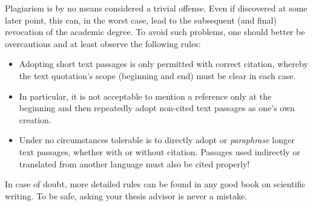 Plagiarism is by no means considered a trivial offense. Even if discovered at some later
point, this can, in the worst case, lead to the subsequent (and final) revocation of the
academic degree. To avoid such problems, one should better be overcautious and at
least observe the following rules:
%
\begin{itemize}
    \item
    Adopting short text passages is only permitted with correct citation,
    whereby the text quotation's scope (beginning and end) must be clear in each
    case.
    \item
    In particular, it is not acceptable to mention a reference only at the
    beginning and then repeatedly adopt non-cited text passages as
    one's own creation.
    \item
    Under no circumstances tolerable is to directly adopt or \emph{paraphrase}
    longer text passages, whether with or without citation. Passages used
    indirectly or translated from another language must also be cited properly!
\end{itemize}
%
In case of doubt, more detailed rules can be found in any good book on
scientific writing. To be safe, asking your thesis advisor is never a mistake.

